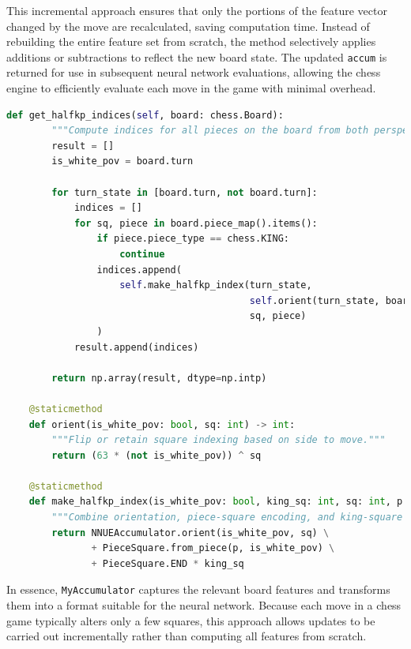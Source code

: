 \documentclass[12pt,a4paper]{article}
\begin{document}
This incremental approach ensures that only the portions of the feature vector changed by the move are recalculated, saving computation time. Instead of rebuilding the entire feature set from scratch, the method selectively applies additions or subtractions to reflect the new board state. The updated \texttt{accum} is returned for use in subsequent neural network evaluations, allowing the chess engine to efficiently evaluate each move in the game with minimal overhead.

\begin{lstlisting}[language=Python, caption={Part 3: Utility methods for orientation and index computation}, label={lst:accumulator_utilities}, basicstyle=\footnotesize\ttfamily,breaklines=true]
    def get_halfkp_indices(self, board: chess.Board):
        """Compute indices for all pieces on the board from both perspectives."""
        result = []
        is_white_pov = board.turn

        for turn_state in [board.turn, not board.turn]:
            indices = []
            for sq, piece in board.piece_map().items():
                if piece.piece_type == chess.KING:
                    continue
                indices.append(
                    self.make_halfkp_index(turn_state, 
                                           self.orient(turn_state, board.king(turn_state)), 
                                           sq, piece)
                )
            result.append(indices)

        return np.array(result, dtype=np.intp)

    @staticmethod
    def orient(is_white_pov: bool, sq: int) -> int:
        """Flip or retain square indexing based on side to move."""
        return (63 * (not is_white_pov)) ^ sq

    @staticmethod
    def make_halfkp_index(is_white_pov: bool, king_sq: int, sq: int, p: chess.Piece) -> int:
        """Combine orientation, piece-square encoding, and king-square indexing for HalfKP."""
        return NNUEAccumulator.orient(is_white_pov, sq) \
               + PieceSquare.from_piece(p, is_white_pov) \
               + PieceSquare.END * king_sq
\end{lstlisting}

In essence, \texttt{MyAccumulator} captures the relevant board features and transforms them into a format suitable for the neural network. Because each move in a chess game typically alters only a few squares, this approach allows updates to be carried out incrementally rather than computing all features from scratch.
\end{document}
